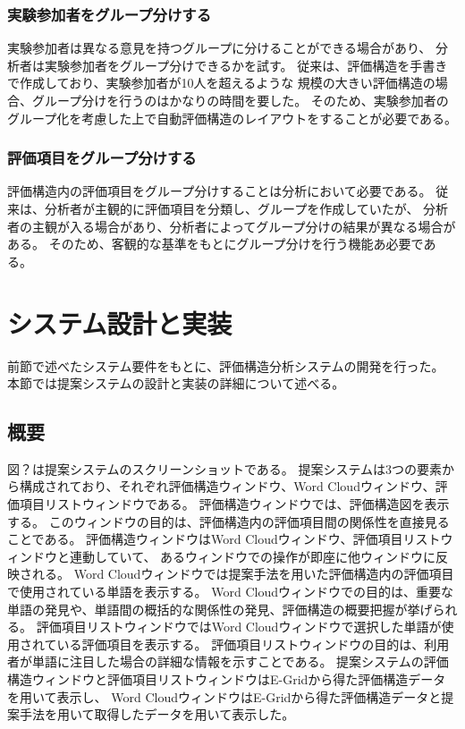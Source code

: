\documentclass[syuuron]{kuee}
\begin{document}
		\subsubsection{実験参加者をグループ分けする}
			実験参加者は異なる意見を持つグループに分けることができる場合があり、
			分析者は実験参加者をグループ分けできるかを試す。
			従来は、評価構造を手書きで作成しており、実験参加者が10人を超えるような
			規模の大きい評価構造の場合、グループ分けを行うのはかなりの時間を要した。
			そのため、実験参加者のグループ化を考慮した上で自動評価構造のレイアウトをすることが必要である。
		\subsubsection{評価項目をグループ分けする}
			評価構造内の評価項目をグループ分けすることは分析において必要である。
			従来は、分析者が主観的に評価項目を分類し、グループを作成していたが、
			分析者の主観が入る場合があり、分析者によってグループ分けの結果が異なる場合がある。
			そのため、客観的な基準をもとにグループ分けを行う機能あ必要である。
	\section{システム設計と実装}
		前節で述べたシステム要件をもとに、評価構造分析システムの開発を行った。
		本節では提案システムの設計と実装の詳細について述べる。
		\subsection{概要}
			図？は提案システムのスクリーンショットである。
			提案システムは3つの要素から構成されており、それぞれ評価構造ウィンドウ、Word Cloudウィンドウ、評価項目リストウィンドウである。
			評価構造ウィンドウでは、評価構造図を表示する。
			このウィンドウの目的は、評価構造内の評価項目間の関係性を直接見ることである。
			評価構造ウィンドウはWord Cloudウィンドウ、評価項目リストウィンドウと連動していて、
			あるウィンドウでの操作が即座に他ウィンドウに反映される。
			Word Cloudウィンドウでは提案手法を用いた評価構造内の評価項目で使用されている単語を表示する。
			Word Cloudウィンドウでの目的は、重要な単語の発見や、単語間の概括的な関係性の発見、評価構造の概要把握が挙げられる。
			評価項目リストウィンドウではWord Cloudウィンドウで選択した単語が使用されている評価項目を表示する。
			評価項目リストウィンドウの目的は、利用者が単語に注目した場合の詳細な情報を示すことである。
			提案システムの評価構造ウィンドウと評価項目リストウィンドウはE-Gridから得た評価構造データを用いて表示し、
			Word CloudウィンドウはE-Gridから得た評価構造データと提案手法を用いて取得したデータを用いて表示した。
			
\end{document}
